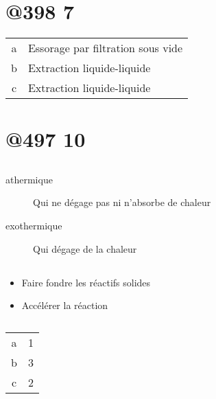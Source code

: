 \documentclass{article}
\begin{document}
\section{@398 7}

\begin{table}[h]
	\begin{tabular}{c|l}
		a & Essorage par filtration sous vide \\
		b & Extraction liquide-liquide \\
		c & Extraction liquide-liquide
	\end{tabular}
\end{table}

\section{@497 10}

\subsection{}

\begin{description}
	\item[athermique] Qui ne dégage pas ni n'absorbe de chaleur
	\item[exothermique] Qui dégage de la chaleur
\end{description}

\subsection{}

\begin{itemize}
	\item Faire fondre les réactifs solides
	\item Accélérer la réaction
\end{itemize}

\subsection{}


\begin{table}[h]
	\begin{tabular}{c|l}
		a & 1 \\
		b & 3 \\
		c & 2 \\
	\end{tabular}
\end{table}
\end{document}
